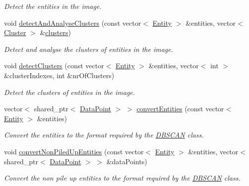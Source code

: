 \begin{DoxyCompactItemize}
\begin{DoxyCompactList}\small\item\em \-Detect the entities in the image. \end{DoxyCompactList}\item 
void \hyperlink{classmultiscale_1_1analysis_1_1ClusterDetector_a46f98e066e74171774f0b6728118bc7b}{detect\-And\-Analyse\-Clusters} (const vector$<$ \hyperlink{classmultiscale_1_1analysis_1_1Entity}{\-Entity} $>$ \&entities, vector$<$ \hyperlink{classmultiscale_1_1analysis_1_1Cluster}{\-Cluster} $>$ \&\hyperlink{classmultiscale_1_1analysis_1_1ClusterDetector_aa81a8649bc743389c2fc1919d47eb5b3}{clusters})
\begin{DoxyCompactList}\small\item\em \-Detect and analyse the clusters of entities in the image. \end{DoxyCompactList}\item 
void \hyperlink{classmultiscale_1_1analysis_1_1ClusterDetector_a8c9c3ac0c3d8e924468a58f558984dda}{detect\-Clusters} (const vector$<$ \hyperlink{classmultiscale_1_1analysis_1_1Entity}{\-Entity} $>$ \&entities, vector$<$ int $>$ \&cluster\-Indexes, int \&nr\-Of\-Clusters)
\begin{DoxyCompactList}\small\item\em \-Detect the clusters of entities in the image. \end{DoxyCompactList}\item 
vector$<$ shared\-\_\-ptr$<$ \hyperlink{classmultiscale_1_1analysis_1_1DataPoint}{\-Data\-Point} $>$ $>$ \hyperlink{classmultiscale_1_1analysis_1_1ClusterDetector_aa45fe0a4a548b4d44407ee7f346e66d3}{convert\-Entities} (const vector$<$ \hyperlink{classmultiscale_1_1analysis_1_1Entity}{\-Entity} $>$ \&entities)
\begin{DoxyCompactList}\small\item\em \-Convert the entities to the format required by the \hyperlink{classmultiscale_1_1analysis_1_1DBSCAN}{\-D\-B\-S\-C\-A\-N} class. \end{DoxyCompactList}\item 
void \hyperlink{classmultiscale_1_1analysis_1_1ClusterDetector_a4b42b3de7411fe02c7871064497feef1}{convert\-Non\-Piled\-Up\-Entities} (const vector$<$ \hyperlink{classmultiscale_1_1analysis_1_1Entity}{\-Entity} $>$ \&entities, vector$<$ shared\-\_\-ptr$<$ \hyperlink{classmultiscale_1_1analysis_1_1DataPoint}{\-Data\-Point} $>$ $>$ \&data\-Points)
\begin{DoxyCompactList}\small\item\em \-Convert the non pile up entities to the format required by the \hyperlink{classmultiscale_1_1analysis_1_1DBSCAN}{\-D\-B\-S\-C\-A\-N} class. \end{DoxyCompactList}\item 

\end{DoxyCompactItemize}
